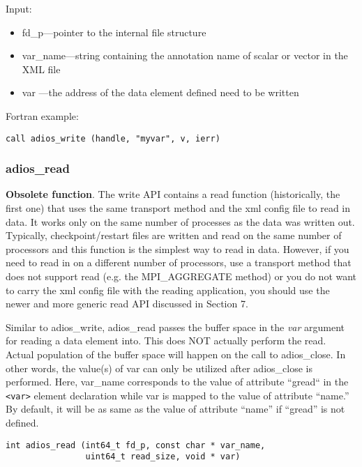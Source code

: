 Input:
\begin{itemize}
\item fd\_p---pointer to the internal file structure
\item var\_name---string containing the annotation name of scalar or vector in the XML file
\item var ---the address of the data element defined need to be written
\end{itemize}

Fortran example: 
\begin{lstlisting}[alsolanguage=Fortran,caption={},label={}]
call adios_write (handle, "myvar", v, ierr)
\end{lstlisting}

\subsubsection{adios\_read}
\label{section:adios_read}

{\bf Obsolete function}.
The write API contains a read function (historically, the first one) that uses 
the same transport method and the xml config file to read in data. It works only 
on the same number of processes as the data was written out. Typically, checkpoint/restart 
files are written and read on the same number of processors and this function is 
the simplest way to read in data. However, if you need to read in on a different 
number of processors, use a transport method that does not support read (e.g. 
the MPI\_AGGREGATE method) or you do not want to carry the xml config file with the 
reading application, you should use the newer and more generic read API discussed 
in Section 7.

Similar to adios\_write, adios\_read passes the buffer space in the \textit{var} argument 
for reading a data element into. This does NOT actually perform the read. Actual 
population of the buffer space will happen on the call to adios\_close. In other 
words, the value(s) of var can only be utilized after adios\_close is performed. 
Here, var\_name corresponds to the value of attribute ``gread`` in the \verb+<var>+
element declaration while var is mapped to the value of attribute ``name.'' By 
default, it will be as same as the value of attribute ``name'' if ``gread'' is 
not defined.

\begin{lstlisting}[alsolanguage=C,caption={},label={}]
int adios_read (int64_t fd_p, const char * var_name, 
                uint64_t read_size, void * var)
\end{lstlisting}

